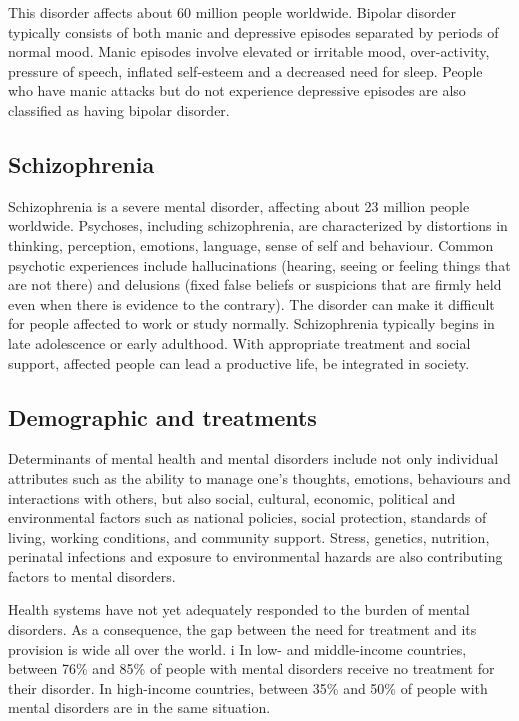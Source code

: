 \documentclass[11pt, onecolumn, twoside]{article}
\begin{document}
This disorder affects about 60 million people worldwide.
Bipolar disorder typically consists of both manic and depressive episodes separated by periods of normal mood.
Manic episodes involve elevated or irritable mood, over-activity, pressure of speech, inflated self-esteem and a decreased need for sleep.
People who have manic attacks but do not experience depressive episodes are also classified as having bipolar disorder.

\subsection{Schizophrenia}\label{schizophrenia}

Schizophrenia is a severe mental disorder, affecting about 23 million people worldwide.
Psychoses, including schizophrenia, are characterized by distortions in thinking, perception, emotions, language, sense of self and behaviour.
Common psychotic experiences include hallucinations (hearing, seeing or feeling things that are not there) and delusions (fixed false beliefs or suspicions that are firmly held even when there is evidence to the contrary).
The disorder can make it difficult for people affected to work or study normally.
Schizophrenia typically begins in late adolescence or early adulthood. With appropriate treatment and social support, affected people can lead a productive life, be integrated in society.

\subsection{Demographic and treatments}\label{demographic-and-treatments}

Determinants of mental health and mental disorders include not only individual attributes such as the ability to manage one's thoughts, emotions, behaviours and interactions with others, but also social, cultural, economic, political and environmental factors such as national policies, social protection, standards of living, working conditions, and community support.
Stress, genetics, nutrition, perinatal infections and exposure to environmental hazards are also contributing factors to mental disorders.

Health systems have not yet adequately responded to the burden of mental disorders.
As a consequence, the gap between the need for treatment and its provision is wide all over the world. i
In low- and middle-income countries, between 76\% and 85\% of people with mental disorders receive no treatment for their disorder. In high-income countries, between 35\% and 50\% of people with mental disorders are in the same situation.
\end{document}
